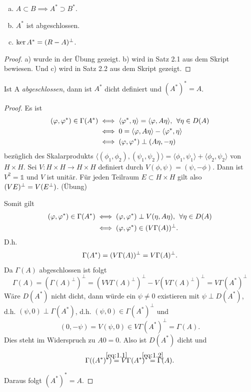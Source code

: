 \documentclass{mycourse}
\begin{document}
\begin{st}\label{1.8}
\begin{enumerate}[a)]
\item $A\subset B \implies A^*\supset B^*$.
\item $A^*$ ist abgeschlossen.
\item $\ker A^*=(R-A)^\perp$. 
\end{enumerate}
\end{st}
\begin{proof}
a) wurde in der Übung gezeigt. b) wird in Satz 2.1 aus dem Skript bewiesen. Und c) wird in Satz 2.2 aus dem Skript gezeigt.
\end{proof}
\begin{st}\label{1.9}
Ist A \emph{abgeschlossen}, dann ist $A^*$ dicht definiert und $(A^*)^*=A$.
\end{st}
\begin{proof}
Es ist
\begin{align*}
(\phi, \phi^*)\in \Gamma(A^*) &\iff \langle \phi^*, \eta\rangle = \langle \phi, A\eta\rangle, \, \forall \eta\in D(A)\\ &\iff 0=\langle \phi, A\eta\rangle - \langle \phi^*, \eta\rangle \\ &\iff (\phi, \phi^*) \orth (A\eta, - \eta)
\end{align*}
bezüglich des Skalarprodukts $\langle (\phi_1, \phi_2), (\psi_1, \psi_2)\rangle=\langle \phi_1, \psi_1\rangle + \langle \phi_2, \psi_2\rangle$ von $H\times H$. Sei $V:H\times H \to H \times H$ definiert durch $V(\phi, \psi)=(\psi, -\phi)$. Dann ist $V^2=\mathbb{1}$ und $V$ ist unitär. Für jeden Teilraum $E\subset H\times H$ gilt also $(VE)^\perp = V(E^\perp)$. (Übung)

Somit gilt
\begin{align*}
(\phi, \phi^*) \in \Gamma(A^*) &\iff (\phi, \phi^*) \orth V(\eta, A\eta), \, \forall \eta\in D(A)\\
&\iff (\phi, \phi^*)\in (V\Gamma(A))^\orth.
\end{align*}
D.h. 
\begin{equation}\label{eq:1.1}
\Gamma(A^*)=(V\Gamma(A))^\perp=V\Gamma(A)^\perp.
\end{equation}
Da $\Gamma(A)$ abgeschlossen ist folgt 
\begin{equation}\label{eq:1.2}
\Gamma(A) = ( \Gamma(A)^\perp)^\perp = (VV \Gamma(A)^\perp)^\perp - V(V\Gamma(A)^\perp)^\perp = V \Gamma(A^*)^\perp
\end{equation}
Wäre $D(A^*)$ nicht dicht, dann würde ein $\psi \neq 0$ existieren mit $\psi \perp D(A^*)$, d.h. $(\psi,0) \perp \Gamma(A^*)$, d.h. $(\psi,0) \in \Gamma(A^*)^\perp$ und 
\[
(0,-\psi)=V(\psi, 0) \in V \Gamma(A^*)^\perp= \Gamma(A). 
\]
Dies steht im Widerspruch zu $A0=0$. Also ist $D(A^*)$ dicht und
\[
\Gamma((A^*)^*)\stack{\eqref{eq:1.1}}= V \Gamma(A^*)^* \stack{\eqref{eq:1.2}}= \Gamma(A).
\]
Daraus folgt $(A^*)^*=A$.
\end{proof}
\end{document}
